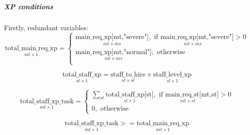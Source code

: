         \subparagraph{XP conditions} \label{xp condition} \text{} \newline
        \hspace*{.5cm}Firstly, redundant variables:
        \begin{equation}
            \underset{mt\times 1}{\mathrm{\text{total\_main\_req\_xp}}} = 
            \begin{cases}
                \underset{mt\times ms}{\text{main\_req\_xp[mt,"severe"]}}, \underset{mt\times ms}{\text{ if } \text{main\_req\_xp[mt,"severe"]}} > 0\\[3ex]
                \underset{mt\times ms}{\text{main\_req\_xp[mt,"normal"]}}, \text{ otherwise}\\
            \end{cases}
        \end{equation}

        \begin{equation}
            \underset{st\times 1}{\text{total\_staff\_xp}} =  
                \underset{st\times sl}{\text{staff\_to\_hire}}\times \underset{sl\times 1}{\text{staff\_level\_xp}}
        \end{equation}

        \begin{equation}
            \underset{mt\times 1}{\text{total\_staff\_xp\_task}} =
            \begin{cases}
                \sum_{st}{\underset{st\times 1}{\text{total\_staff\_xp[st]}}}, \underset{mt\times st}{\text{ if } \text{main\_req\_st[mt,st]}} > 0\\[3ex]
                0, \text{ otherwise}
            \end{cases}
        \end{equation} \newline

        \begin{equation} \label{xpeq}
            \underset{mt\times 1}{\text{total\_staff\_xp\_task}} >=  
                \underset{mt\times 1}{\text{total\_main\_req\_xp}}
        \end{equation}

